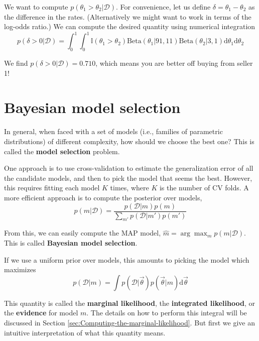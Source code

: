 We want to compute $p(\theta_1 >\theta_2|\mathcal{D})$. For convenience, let us define $\delta=\theta_1-\theta_2$ as the difference in the rates. (Alternatively we might want to work in terms of the log-odds ratio.) We can compute the desired quantity using numerical integration
\begin{equation}
p(\delta>0|\mathcal{D})=\int_0^1{\int_0^1{\mathbb{I}(\theta_1>\theta_2)\text{Beta}(\theta_1|91,11)\text{Beta}(\theta_2|3,1)}\mathrm{d}\theta_1}\mathrm{d}\theta_2
\end{equation}

We find $p(\delta>0|\mathcal{D})=0.710$, which means you are better off buying from seller 1! 


\section{Bayesian model selection}
\label{sec:Bayesian-model-selection}

In general, when faced with a set of models (i.e., families of parametric distributions) of different complexity, how should we choose the best one? This is called the \textbf{model selection} problem.

One approach is to use cross-validation to estimate the generalization error of all the candidate models, and then to pick the model that seems the best. However, this requires fitting each model $K$ times, where $K$ is the number of CV folds. A more efficient approach is to compute the posterior over models,
\begin{equation}
p(m|\mathcal{D})=\dfrac{p(\mathcal{D}|m)p(m)}{\sum_{m'}p(\mathcal{D}|m')p(m')}
\end{equation}

From this, we can easily compute the MAP model, $\hat{m}=\arg\max_m{p(m|\mathcal{D})}$. This is called \textbf{Bayesian model selection}.

If we use a uniform prior over models, this amounts to picking the model which maximizes
\begin{equation}\label{eqn:marginal-likelihood}
p(\mathcal{D}|m)=\int{p(\mathcal{D}|\vec{\theta})p(\vec{\theta}|m)}\mathrm{d}\vec{\theta}
\end{equation}

This quantity is called the \textbf{marginal likelihood}, the \textbf{integrated likelihood}, or the \textbf{evidence} for model $m$. The details on how to perform this integral will be discussed in Section \ref{sec:Computing-the-marginal-likelihood}. But first we give an intuitive interpretation of what this quantity means.


